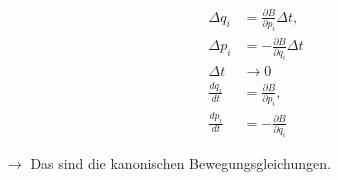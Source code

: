 \begin{frame}
    \begin{align*}
    \Delta q_i &= \frac{\partial B}{\partial p_i} \Delta t,\\
    \Delta p_i &= -\frac{\partial B}{\partial q_i} \Delta t \\[5mm]
      \Delta t &\longrightarrow 0 \\[5mm]
    \frac{dq_i}{dt}  &= \frac{\partial B}{\partial p_i},\\
    \frac{dp_i}{dt} &= -\frac{\partial B}{\partial q_i} 
    \end{align*}
    
    $\rightarrow$ Das sind die kanonischen Bewegungsgleichungen.

\end{frame}